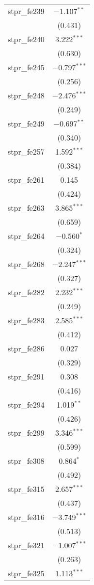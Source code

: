 \begin{table}[!htbp]
\begin{tabular}{@{\extracolsep{5pt}}lc}
  stpr\_fe239 & $-$1.107$^{**}$ \\ 
  & (0.431) \\ 
  stpr\_fe240 & 3.222$^{***}$ \\ 
  & (0.630) \\ 
  stpr\_fe245 & $-$0.797$^{***}$ \\ 
  & (0.256) \\ 
  stpr\_fe248 & $-$2.476$^{***}$ \\ 
  & (0.249) \\ 
  stpr\_fe249 & $-$0.697$^{**}$ \\ 
  & (0.340) \\ 
  stpr\_fe257 & 1.592$^{***}$ \\ 
  & (0.384) \\ 
  stpr\_fe261 & 0.145 \\ 
  & (0.424) \\ 
  stpr\_fe263 & 3.865$^{***}$ \\ 
  & (0.659) \\ 
  stpr\_fe264 & $-$0.560$^{*}$ \\ 
  & (0.324) \\ 
  stpr\_fe268 & $-$2.247$^{***}$ \\ 
  & (0.327) \\ 
  stpr\_fe282 & 2.232$^{***}$ \\ 
  & (0.249) \\ 
  stpr\_fe283 & 2.585$^{***}$ \\ 
  & (0.412) \\ 
  stpr\_fe286 & 0.027 \\ 
  & (0.329) \\ 
  stpr\_fe291 & 0.308 \\ 
  & (0.416) \\ 
  stpr\_fe294 & 1.019$^{**}$ \\ 
  & (0.426) \\ 
  stpr\_fe299 & 3.346$^{***}$ \\ 
  & (0.599) \\ 
  stpr\_fe308 & 0.864$^{*}$ \\ 
  & (0.492) \\ 
  stpr\_fe315 & 2.657$^{***}$ \\ 
  & (0.437) \\ 
  stpr\_fe316 & $-$3.749$^{***}$ \\ 
  & (0.513) \\ 
  stpr\_fe321 & $-$1.007$^{***}$ \\ 
  & (0.263) \\ 
  stpr\_fe325 & 1.113$^{***}$ \\ 

\end{tabular}
\end{table}
